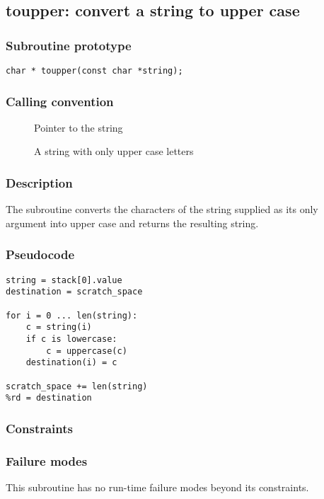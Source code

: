 \clearpage
{}
{}
\label{subr:toupper}
\subsection*{toupper: convert a string to upper case}

\subsubsection*{Subroutine prototype}

\begin{verbatim}
char * toupper(const char *string);
\end{verbatim}

\subsubsection*{Calling convention}

\begin{description}
\item[] Pointer to the string
\item[] A string with only upper case letters
\end{description}

\subsubsection*{Description}

The  subroutine converts the characters of the
string supplied as its only argument into upper case and returns the
resulting string.

\subsubsection*{Pseudocode}

\begin{verbatim}
string = stack[0].value
destination = scratch_space

for i = 0 ... len(string):
    c = string(i)
    if c is lowercase:
        c = uppercase(c)
    destination(i) = c

scratch_space += len(string)
%rd = destination
\end{verbatim}

\subsubsection*{Constraints}

\subsubsection*{Failure modes}

This subroutine has no run-time failure modes beyond its constraints.
